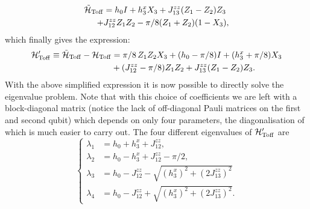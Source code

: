 \begin{equation}
\begin{aligned}
    \tilde{{\mathcal{H}}}_{\operatorname{Toff}} &= h_0 I + h_3^x X_3 + J_{13}^{zz}(Z_1 - Z_2)Z_3 \\
   +& J_{12}^{zz} Z_1 Z_2 - \pi/8 ( Z_1 +  Z_2)(1 - X_3),
\end{aligned}
\end{equation}
which finally gives the expression:
\begin{equation}
\begin{aligned}
	{\mathcal{H}}'_{\operatorname{Toff}}{}\equiv \tilde{{\mathcal{H}}}_{\operatorname{Toff}}-{\mathcal{H}}_{\operatorname{Toff}} &=
		\pi/8\, Z_1 Z_2 X_3 + (h_0 - \pi/8)I
		+ (h_3^x + \pi/8) X_3 \\
		&+ (J_{12}^{zz} - \pi/8) Z_1 Z_2 +
		J_{13}^{zz} (Z_1 - Z_2)Z_3.
\end{aligned}
\label{eq:GL:toffoli_HPrime_reduced}
\end{equation}
With the above simplified expression it is now possible to directly solve the eigenvalue problem. Note that with this choice of coefficients we are left with a block-diagonal matrix (notice the lack of off-diagonal Pauli matrices on the first and second qubit) which depends on only four parameters, the diagonalisation of which is much easier to carry out.
The four different eigenvalues of ${\mathcal{H}}'_{\operatorname{Toff}}{}$ are
\begin{equation}
\begin{cases}
    \lambda_1 &= h_0 + h_3^x + J_{12}^{zz}, \\
    \lambda_2 &= h_0 - h_3^x + J_{12}^{zz} - \pi/2, \\
    \lambda_3 &= h_0 - J_{12}^{zz}
                - \sqrt{(h_3^x)^2+ (2J_{13}^{zz})^2}\\
    \lambda_4 &= h_0 - J_{12}^{zz}
                + \sqrt{(h_3^x)^2+ (2J_{13}^{zz})^2}.
\end{cases}
\end{equation}
